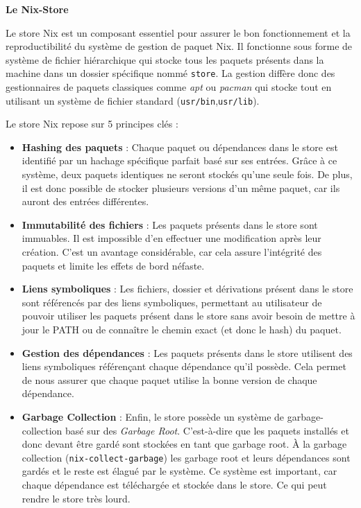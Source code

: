 \documentclass[a4paper,french,12pt, titlepage]{article}
\begin{document}
\textbf{Le Nix-Store}\newline

Le store Nix est un composant essentiel pour assurer le bon
fonctionnement et la reproductibilité du système de gestion de paquet
Nix. Il fonctionne sous forme de système de fichier hiérarchique qui
stocke tous les paquets présents dans la machine dans un dossier
spécifique nommé \texttt{store}. La gestion diffère donc des
gestionnaires de paquets classiques comme \emph{apt} ou \emph{pacman}
qui stocke tout en utilisant un système de fichier standard
(\texttt{usr/bin},\texttt{usr/lib}).\newline

Le store Nix repose sur 5 principes clés :

\begin{itemize}
\item
  \textbf{Hashing des paquets} : Chaque paquet ou dépendances dans le
  store est identifié par un hachage spécifique parfait basé sur ses
  entrées. Grâce à ce système, deux paquets identiques ne seront stockés
  qu'une seule fois. De plus, il est donc possible de stocker plusieurs
  versions d'un même paquet, car ils auront des entrées différentes.
\item
  \textbf{Immutabilité des fichiers} : Les paquets présents dans le
  store sont immuables. Il est impossible d'en effectuer une
  modification après leur création. C'est un avantage considérable, car
  cela assure l'intégrité des paquets et limite les effets de bord
  néfaste.
\item
  \textbf{Liens symboliques} : Les fichiers, dossier et dérivations
  présent dans le store sont référencés par des liens symboliques,
  permettant au utilisateur de pouvoir utiliser les paquets présent dans
  le store sans avoir besoin de mettre à jour le PATH ou de connaître le
  chemin exact (et donc le hash) du paquet.
\item
  \textbf{Gestion des dépendances} : Les paquets présents dans le store
  utilisent des liens symboliques référençant chaque dépendance qu'il
  possède. Cela permet de nous assurer que chaque paquet utilise la
  bonne version de chaque dépendance.
\item
  \textbf{Garbage Collection} : Enfin, le store possède un système de
  \gls{garbage-collection} basé sur des \emph{Garbage Root}.
  C'est-à-dire que les paquets installés et donc devant être gardé sont
  stockées en tant que garbage root. À la garbage collection
  (\texttt{nix-collect-garbage}) les garbage root et leurs dépendances
  sont gardés et le reste est élagué par le système. Ce système est
  important, car chaque dépendance est téléchargée et stockée dans le
  store. Ce qui peut rendre le store très lourd.\newline
\end{itemize}
\end{document}
